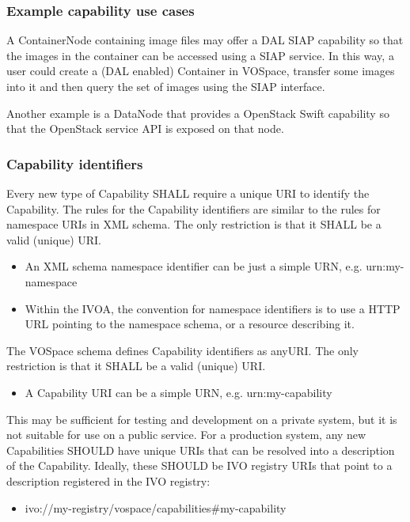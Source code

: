 \documentclass[11pt,a4paper]{ivoa}
\begin{document}
\subsubsection{Example capability use cases}
\label{subsubsec:example capability use cases}
A ContainerNode containing image files may offer a DAL SIAP capability so that the images in the container can be accessed using a SIAP service. In this way, a user could create a (DAL enabled) Container in VOSpace, transfer some images into it and then query the set of images using the SIAP interface.

Another example is a DataNode that provides a OpenStack Swift capability so that the OpenStack service API is exposed on that node.

\subsubsection{Capability identifiers}
\label{subsubsec:capability identifiers}
Every new type of Capability SHALL require a unique URI to identify the Capability. The rules for the Capability identifiers are similar to the rules for namespace URIs in XML schema. The only restriction is that it SHALL be a valid (unique) URI.

\begin{itemize}
    \item An XML schema namespace identifier can be just a simple URN, e.g. urn:my-namespace
    \item Within the IVOA, the convention for namespace identifiers is to use a HTTP URL pointing to the namespace schema, or a resource describing it.
\end{itemize}

The VOSpace schema defines Capability identifiers as anyURI. The only restriction is that it SHALL be a valid (unique) URI.

\begin{itemize}
    \item A Capability URI can be a simple URN, e.g. urn:my-capability
\end{itemize}

This may be sufficient for testing and development on a private system, but it is not suitable for use on a public service. For a production system, any new Capabilities SHOULD have unique URIs that can be resolved into a description of the Capability. Ideally, these SHOULD be IVO registry URIs that point to a description registered in the IVO registry:

\begin{itemize}
    \item ivo://my-registry/vospace/capabilities\#my-capability
\end{itemize}
\end{document}
